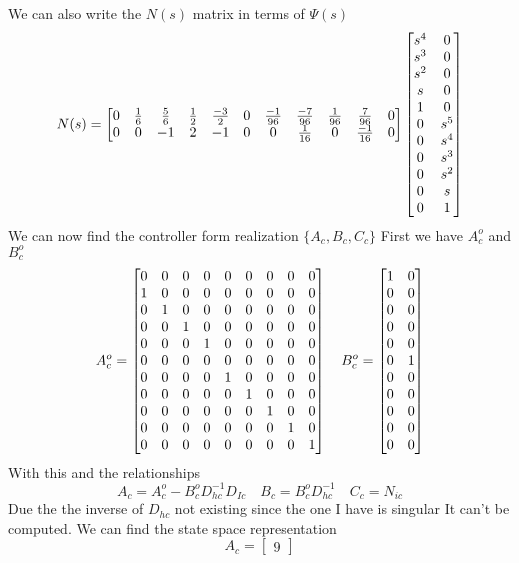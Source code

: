 \documentclass{article}
\begin{document}
We can also write the $N(s)$ matrix in terms of $\Psi(s)$
$$
N(s) =
\setcounter{MaxMatrixCols}{11}
\begin{bmatrix}
0 & \frac{1}{6} & \frac{5}{6} & \frac{1}{2} & \frac{-3}{2} & 0 & \frac{-1}{96} & \frac{-7}{96} & \frac{1}{96} & \frac{7}{96} & 0 \\
0 & 0& -1 &2 & -1 & 0 & 0 & \frac{1}{16} & 0 & \frac{-1}{16} & 0 \\
\end{bmatrix}
\begin{bmatrix}
s^4 & 0 \\
s^3 & 0 \\
s^2 & 0 \\
  s & 0 \\
  1 & 0 \\
  0 & s^5 \\
  0 & s^4 \\
  0 & s^3 \\
  0 & s^2 \\
  0 & s \\
  0 & 1 \\
\end{bmatrix}
$$
We can now find the controller form realization $\{A_c,B_c,C_c\}$
First we have $A_c^o$ and $B_c^o$
$$
A_c^o =
\setcounter{MaxMatrixCols}{11}
\begin{bmatrix}
0 & 0 & 0 & 0 & 0 & 0 & 0 & 0 & 0 \\
1 & 0 & 0 & 0 & 0 & 0 & 0 & 0 & 0 \\
0 & 1 & 0 & 0 & 0 & 0 & 0 & 0 & 0 \\
0 & 0 & 1 & 0 & 0 & 0 & 0 & 0 & 0 \\
0 & 0 & 0 & 1 & 0 & 0 & 0 & 0 & 0 \\
0 & 0 & 0 & 0 & 0 & 0 & 0 & 0 & 0 \\
0 & 0 & 0 & 0 & 1 & 0 & 0 & 0 & 0 \\
0 & 0 & 0 & 0 & 0 & 1 & 0 & 0 & 0 \\
0 & 0 & 0 & 0 & 0 & 0 & 1 & 0 & 0 \\
0 & 0 & 0 & 0 & 0 & 0 & 0 & 1 & 0 \\
0 & 0 & 0 & 0 & 0 & 0 & 0 & 0 & 1 \\
\end{bmatrix}
\quad
B_c^o =
\begin{bmatrix}
1 & 0 \\
0 & 0 \\
0 & 0 \\
0 & 0 \\
0 & 0 \\
0 & 1 \\
0 & 0 \\
0 & 0 \\
0 & 0 \\
0 & 0 \\
0 & 0 \\
\end{bmatrix}
$$
With this and the relationships
$$ A_c = A_c^o - B_c^o D_{hc}^{-1}D_{Ic} \quad B_c = B_c^oD_{hc}^{-1} \quad C_c = N_{ic} $$
Due the the inverse of $D_{hc}$ not existing since the one I have is singular It can't be computed.
We can find the state space representation
$$
A_c =
\begin{bmatrix}
9
\end{bmatrix}
$$
\end{document}
